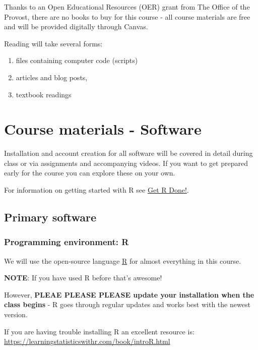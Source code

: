 \documentclass[
]{book}
\providecommand{\tightlist}{%
  \setlength{\itemsep}{0pt}\setlength{\parskip}{0pt}}
\begin{document}
Thanks to an Open Educational Resources (OER) grant from The Office of the Provost, there are no books to buy for this course - all course materials are free and will be provided digitally through Canvas.

Reading will take several forms:

\begin{enumerate}
\def\labelenumi{\arabic{enumi}.}
\tightlist
\item
  files containing computer code (scripts)
\item
  articles and blog posts,
\item
  textbook readings
\end{enumerate}

\hypertarget{course-materials---software}{%
\chapter{Course materials - Software}\label{course-materials---software}}

Installation and account creation for all software will be covered in detail during class or via assignments and accompanying videos. If you want to get prepared early for the course you can explore these on your own.

For information on getting started with R see \href{https://brouwern.github.io/getRdone/}{Get R Done!}.

\hypertarget{primary-software}{%
\section{Primary software}\label{primary-software}}

\hypertarget{programming-environment-r}{%
\subsection{Programming environment: R}\label{programming-environment-r}}

We will use the open-source language \href{https://cran.r-project.org/}{R} for almost everything in this course.

\textbf{NOTE}: If you have used R before that's awesome!

However, \textbf{PLEAE PLEASE PLEASE update your installation when the class begins} - R goes through regular updates and works best with the newest version.

If you are having trouble installing R an excellent resource is:
\url{https://learningstatisticswithr.com/book/introR.html}
\end{document}
